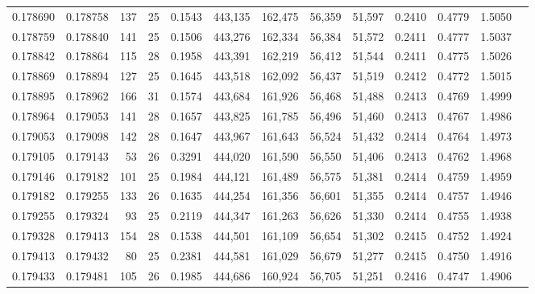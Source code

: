 \begin{tabular}{rrrrrrrrrrrrr}
0.178690 & 0.178758 & 137 &  25 &                                     0.1543 & 443,135 & 162,475 &  56,359 &  51,597 & 0.2410 & 0.4779 & 1.5050 \\
0.178759 & 0.178840 & 141 &  25 &                                     0.1506 & 443,276 & 162,334 &  56,384 &  51,572 & 0.2411 & 0.4777 & 1.5037 \\
0.178842 & 0.178864 & 115 &  28 &                                     0.1958 & 443,391 & 162,219 &  56,412 &  51,544 & 0.2411 & 0.4775 & 1.5026 \\
0.178869 & 0.178894 & 127 &  25 &                                     0.1645 & 443,518 & 162,092 &  56,437 &  51,519 & 0.2412 & 0.4772 & 1.5015 \\
0.178895 & 0.178962 & 166 &  31 &                                     0.1574 & 443,684 & 161,926 &  56,468 &  51,488 & 0.2413 & 0.4769 & 1.4999 \\
0.178964 & 0.179053 & 141 &  28 &                                     0.1657 & 443,825 & 161,785 &  56,496 &  51,460 & 0.2413 & 0.4767 & 1.4986 \\
0.179053 & 0.179098 & 142 &  28 &                                     0.1647 & 443,967 & 161,643 &  56,524 &  51,432 & 0.2414 & 0.4764 & 1.4973 \\
0.179105 & 0.179143 &  53 &  26 &                                     0.3291 & 444,020 & 161,590 &  56,550 &  51,406 & 0.2413 & 0.4762 & 1.4968 \\
0.179146 & 0.179182 & 101 &  25 &                                     0.1984 & 444,121 & 161,489 &  56,575 &  51,381 & 0.2414 & 0.4759 & 1.4959 \\
0.179182 & 0.179255 & 133 &  26 &                                     0.1635 & 444,254 & 161,356 &  56,601 &  51,355 & 0.2414 & 0.4757 & 1.4946 \\
0.179255 & 0.179324 &  93 &  25 &                                     0.2119 & 444,347 & 161,263 &  56,626 &  51,330 & 0.2414 & 0.4755 & 1.4938 \\
0.179328 & 0.179413 & 154 &  28 &                                     0.1538 & 444,501 & 161,109 &  56,654 &  51,302 & 0.2415 & 0.4752 & 1.4924 \\
0.179413 & 0.179432 &  80 &  25 &                                     0.2381 & 444,581 & 161,029 &  56,679 &  51,277 & 0.2415 & 0.4750 & 1.4916 \\
0.179433 & 0.179481 & 105 &  26 &                                     0.1985 & 444,686 & 160,924 &  56,705 &  51,251 & 0.2416 & 0.4747 & 1.4906 \\

\end{tabular}
